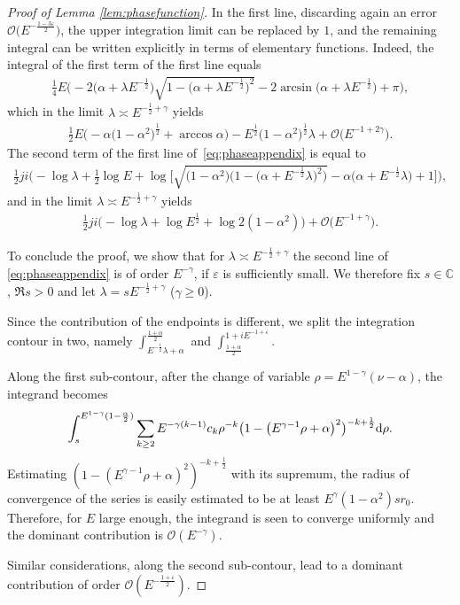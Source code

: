 \documentclass[pdftex]{sigma}
\numberwithin{equation}{section}
\newcommand{\e}{\varepsilon}
\newcommand{\bb}[1]{\mathbb{ #1 }}
\newcommand{\la}{\lambda}
\newcommand{\al}{\alpha}
\begin{document}
\begin{proof}[Proof of Lemma \ref{lem:phasefunction}]
In the f\/irst line, discarding again an error $\mathcal{O}\big(E^{-\frac{1-3\e}{2}}\big)$, the upper integration limit can be replaced by $1$, and the remaining integral can be written explicitly in terms of elementary functions. Indeed, the integral of the f\/irst term of the f\/irst line equals
	\begin{gather*}
	\tfrac{1}{4}E \big({-}2 \big(\al+\la E^{-\frac12}\big) \sqrt{1-\big(\al+\la E^{-\frac12}\big)^2}
	-2\arcsin\big(\al+\la E^{-\frac12}\big)+\pi \big),
	\end{gather*}
	which in the limit $\la\asymp E^{-\frac12+\gamma}$ yields
	\begin{gather*}
	\tfrac{1}{2}E\big({-}\al\big(1-\al^2\big)^{\frac12}+\arccos{\al}\big)-E^{\frac12}\big(1-\al^2\big)^{\frac12}\la+\mathcal{O}\big(E^{-1+2\gamma}\big) .
	\end{gather*}
	The second term of the f\/irst line of~\eqref{eq:phaseappendix} is equal to
	\begin{gather*}
	\tfrac{1}{2}ji\Big({-}\log\la +\tfrac12 \log E+
	\log\Big[\sqrt{\big(1-\al^2\big) \big(1-\big(\al+E^{-\frac12}\la\big)^2\big)}-\al \big(\al+E^{-\frac12}\la\big)+1 \Big] \Big),
	\end{gather*}
	and in the limit $\la\asymp E^{-\frac12+\gamma}$ yields
	\begin{gather*}
	\tfrac{1}{2}ji\big({-}\log\la +\log E^{\frac12}+
	\log2(1-\al^2)\big)+\mathcal{O}\big(E^{-1+\gamma}\big) .
	\end{gather*}
	
To conclude the proof, we show that for $\la\asymp E^{-\frac12+\gamma}$ the second line of \eqref{eq:phaseappendix} is of order $E^{-\gamma}$, if $\e$ is suf\/f\/iciently small. We therefore f\/ix $s \in \bb{C}$, $\Re s >0$ and let $\la=s E^{-\frac12 +\gamma}$ ($\gamma \geq0$).
	
Since the contribution of the endpoints is dif\/ferent, we split the integration contour in two, namely $\int_{E^{-\frac12}\la+\al}^{\frac{1+\alpha}{2}}$ and $\int_{\frac{1+\alpha}{2}}^{1+i E^{-1+\e}}$.
	
	
Along the f\/irst sub-contour, after the change of variable $\rho=E^{1-\gamma}(\nu-\al)$, the integrand becomes
	\begin{gather*}
\int_{s}^{E^{1-\gamma} (1-\frac\al2)} \sum_{k \geq 2} E^{-\gamma(k-1)} c_k \rho^{-k}\big(1-\big(E^{\gamma-1}\rho+\al\big)^2\big)^{-k+\frac12} {\rm d}\rho .
	\end{gather*}
Estimating $(1-(E^{\gamma-1}\rho+\al)^2)^{-k+\frac12}$ with its supremum, the radius of convergence of the series is easily estimated to be at least $E^{\gamma}(1-\al^2)s r_0$. Therefore, for $E$ large enough, the integrand is seen to converge uniformly and the dominant contribution is $\mathcal{O}(E^{-\gamma})$.
	
	Similar considerations, along the second sub-contour, lead to a dominant contribution of order $\mathcal{O}(E^{-\frac{1+\e}2})$.
\end{proof}
\end{document}
